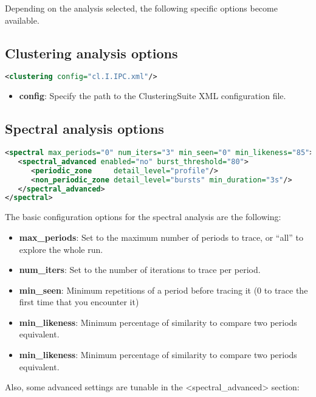   Depending on the analysis selected, the following specific options become available.

\subsection{Clustering analysis options}

\begin{lstlisting}[language=XML,frame=single]
<clustering config="cl.I.IPC.xml"/>
\end{lstlisting}

\begin{itemize}
 \item \textbf{config}: Specify the path to the ClusteringSuite XML configuration file.
\end{itemize}

\subsection{Spectral analysis options}

\begin{lstlisting}[language=XML,frame=single]
<spectral max_periods="0" num_iters="3" min_seen="0" min_likeness="85">
   <spectral_advanced enabled="no" burst_threshold="80">
      <periodic_zone     detail_level="profile"/>                 
      <non_periodic_zone detail_level="bursts" min_duration="3s"/> 
   </spectral_advanced>
</spectral>
\end{lstlisting}

The basic configuration options for the spectral analysis are the following:

\begin{itemize}
 \item \textbf{max\_periods}: Set to the maximum number of periods to trace, or ``all'' to explore the whole run.
 \item \textbf{num\_iters}: Set to the number of iterations to trace per period.
 \item \textbf{min\_seen}: Minimum repetitions of a period before tracing it (0 to trace the first time that you encounter it)
 \item \textbf{min\_likeness}: Minimum percentage of similarity to compare two periods equivalent.
 \item \textbf{min\_likeness}: Minimum percentage of similarity to compare two periods equivalent.
\end{itemize}

Also, some advanced settings are tunable in the <spectral\_advanced> section:

